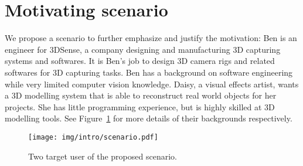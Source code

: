\section{Motivating scenario}
We propose a scenario to further emphasize and justify the motivation: Ben is an engineer for 3DSense, a company designing and manufacturing 3D capturing systems and softwares. It is Ben's job to design 3D camera rigs and related softwares for 3D capturing tasks. Ben has a background on software engineering while very limited computer vision knowledge. Daisy, a visual effects artist, wants a 3D modelling system that is able to reconstruct real world objects for her projects. She has little programming experience, but is highly skilled at 3D modelling tools. See Figure~\ref{fig:scenario_user} for more details of their backgrounds respectively.
\begin{figure}[!htbp]
\centering
\texttt{[image: img/intro/scenario.pdf]}
\caption{Two target user of the proposed scenario.}
\label{fig:scenario_user}
\end{figure}

